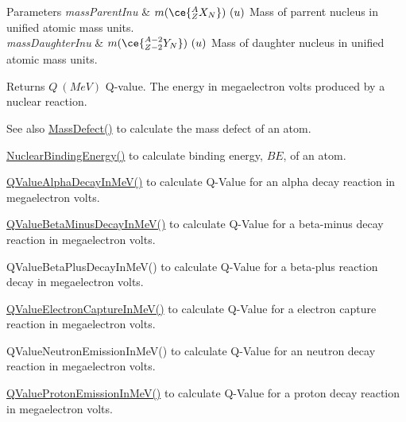 \begin{DoxyParams}{Parameters}
{\em mass\+Parent\+Inu} & $m(\ce{ ^{A}_{Z}X_{N} })\ (u)$ Mass of parrent nucleus in unified atomic mass units. \\
\hline
{\em mass\+Daughter\+Inu} & $m(\ce{ ^{A-2}_{Z-2}Y_{N} })\ (u)$ Mass of daughter nucleus in unified atomic mass units. \\
\hline
\end{DoxyParams}
\begin{DoxyReturn}{Returns}
$Q\ (MeV)$ Q-\/value. The energy in megaelectron volts produced by a nuclear reaction. 
\end{DoxyReturn}
\begin{DoxySeeAlso}{See also}
\mbox{\hyperlink{group___e_g_x_phys-_mass_defect_gae89f2dfa65992c0314adc2440b2f582a}{Mass\+Defect()}} to calculate the mass defect of an atom. 

\mbox{\hyperlink{group___e_g_x_phys-_nuclear_binding_energy_gab6832bf15ead7b4e867e759e0a2a078e}{Nuclear\+Binding\+Energy()}} to calculate binding energy, $BE$, of an atom. 

\mbox{\hyperlink{group___e_g_x_phys-_q_value-_alpha_ga4f9a38d3ad4bf93471a0affb493b6e72}{Q\+Value\+Alpha\+Decay\+In\+Me\+V()}} to calculate Q-\/\+Value for an alpha decay reaction in megaelectron volts. 

\mbox{\hyperlink{group___e_g_x_phys-_q_value-_beta_minus_gaac1374ce9ba39bef416f34298708bda9}{Q\+Value\+Beta\+Minus\+Decay\+In\+Me\+V()}} to calculate Q-\/\+Value for a beta-\/minus decay reaction in megaelectron volts. 

Q\+Value\+Beta\+Plus\+Decay\+In\+Me\+V() to calculate Q-\/\+Value for a beta-\/plus reaction decay in megaelectron volts. 

\mbox{\hyperlink{group___e_g_x_phys-_q_value-_electron_capture_ga9cd8502b6101614c17114e9710cdcf6c}{Q\+Value\+Electron\+Capture\+In\+Me\+V()}} to calculate Q-\/\+Value for a electron capture reaction in megaelectron volts. 

Q\+Value\+Neutron\+Emission\+In\+Me\+V() to calculate Q-\/\+Value for an neutron decay reaction in megaelectron volts. 

\mbox{\hyperlink{group___e_g_x_phys-_q_value-_proton_ga5d92756e945e66bd2ed7d55145b95c3b}{Q\+Value\+Proton\+Emission\+In\+Me\+V()}} to calculate Q-\/\+Value for a proton decay reaction in megaelectron volts. 
\end{DoxySeeAlso}
\mbox{\label{group___e_g_x_phys-_q_value-_proton_ga41f19b0d9a2dc06e89de44aaa2d48d62}} 
